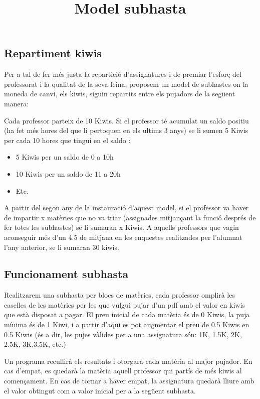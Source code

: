 \documentclass[a4paper,12pt]{article}
\title{Model subhasta}
\author{ }
\date{}
\begin{document}
\maketitle

\subsection{Repartiment kiwis}
Per a tal de fer més justa la repartició d'assignatures i de premiar l'esforç del professorat i la qualitat de la seva feina, proposem un model de subhastes on la moneda de canvi, els kiwis, siguin repartits entre els pujadors de la següent manera:

Cada professor parteix de 10 Kiwis.
Si el professor té acumulat un saldo positiu (ha fet més hores del que li pertoquen en els ultims 3 anys) se li sumen 5 Kiwis per cada 10 hores que tingui en el saldo : 
\begin{itemize}
    \item 5 Kiwis per un saldo de 0 a 10h
    \item 10 Kiwis per un saldo de 11 a 20h
    \item  Etc.
\end{itemize}

A partir del segon any de la instauració d'aquest model, si el professor va haver de impartir x matèries que no va triar (assignades mitjançant la funció després de fer totes les subhastes) se li sumaran x Kiwis. A aquells professors que vagin aconseguir més d'un 4.5 de mitjana en les enquestes realitzades per l'alumnat l'any anterior,  se li sumaran 30 kiwis. 

\subsection{Funcionament subhasta}

Realitzarem una subhasta per blocs de matèries, cada professor omplirà les caselles de les matèries per les que vulgui pujar d'un pdf amb el valor en kiwis que està disposat  a pagar. El preu inicial de cada matèria és de 0 Kiwis, la puja mínima és de 1 Kiwi, i a partir d'aquí es pot augmentar el preu de 0.5 Kiwis en 0.5 Kiwis (és a dir, les pujes vàlides per a una assignatura són: 1K, 1.5K, 2K, 2.5K, 3K,3.5K, etc.)

Un programa recullirà els resultats i otorgarà cada matèria al major pujador. En cas d'empat, es quedarà la matèria aquell professor qui partís de més kiwis al començament. En cas de tornar a haver empat, la assignatura quedarà lliure amb el valor obtingut com a valor inicial per a la següent subhasta.
\end{document}

